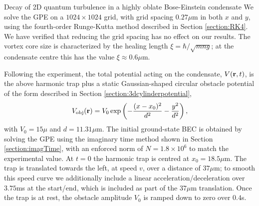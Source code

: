 \begin{chapter}{\label{cha:shin}Decay of 2D quantum turbulence in a highly oblate Bose-Einstein condensate}
We solve the GPE on a $1024 \times 1024$ grid, with grid spacing $0.27\mu$m in both $x$ and $y$, using the fourth-order Runge-Kutta method described in Section \ref{section:RK4}. We have verified that reducing the grid spacing has no effect on our results. The vortex core size is characterized by the healing length $\xi=\hbar/\sqrt{m n g}$; at the condensate centre this has the value $\xi \approx 0.6 \mu$m.

Following the experiment, the total potential acting on the condensate, $V({\bf r},t)$, is the above harmonic trap plus a static Gaussian-shaped circular obstacle potential of the form described in Section \ref{section:3dcylinderpotential},
\begin{equation}
  V_{\rm{obj}}({\bf r}) = V_0 \exp\left ( -\frac{(x-x_0)^2}{d^2}-\frac{y^2}{d^2}\right ),
\end{equation}
with $V_0=15 \mu$ and $d=11.31\mu$m.  The initial ground-state BEC is obtained by solving the GPE using the imaginary time method shown in Section \ref{section:imagTime}, with an enforced norm of $N=1.8\times 10^6$ to match the experimental value.  At $t=0$ the harmonic trap is centred at $x_0=18.5\mu$m. The trap is translated towards the left, at speed $v$, over a distance of $37 \mu$m; to smooth this speed curve we additionally include a linear acceleration/deceleration over $3.75$ms at the start/end, which is included as part of the $37\mu$m translation.  Once the trap is at rest, the obstacle amplitude $V_0$ is ramped down to zero over $0.4$s.


\end{chapter}
